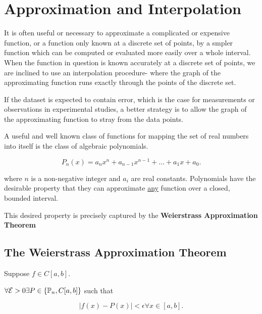 \section{Approximation and Interpolation}

It is often useful or necessary to approximate a complicated or expensive function,
or a function only known at a discrete set of points, by a smpler function
which can be computed or evaluated more easily over a whole interval. When the
function in question is known accurately at a discrete set of points, we are
inclined to use an interpolation procedure- where the graph of the approximating 
function runs exactly through the points of the discrete set. 

If the dataset is expected to contain error, which is the case for measurements
or observations in experimental studies, a better strategy is to allow the
graph of the approximating function to stray from the data points.


A useful and well known class of functions for mapping the set of real numbers
into itself is the class of algebraic polynomials.

\[
  P_n(x) = a_nx^n + a_{n-1}x^{n-1} + \dots + a_1x + a_0
.\]

where $n$ is a non-negative integer and $a_i$ are real constants. Polynomials 
have the desirable property that they can approximate \uline{any} function
over a closed, bounded interval.

This desired property is precisely captured by the \textbf{Weierstrass 
Approximation Theorem}

\pagebreak

\subsection{The Weierstrass Approximation Theorem}

Suppose $f \in C[a,b]$. 

$\forall \mathcal{E} > 0 \exists P \in \{ \mathbb{P}_n , C[a,b] \}$ such that

\[
  |f(x)-P(x)| < \epsilon \forall x \in [a,b]
.\]

